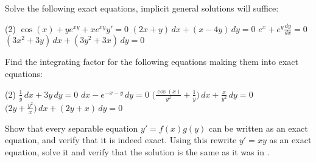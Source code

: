 \begin{exercise}
Solve the following exact equations, implicit general solutions
will suffice:
\begin{tasks}(2)
\task
$\cos(x)+ye^{xy} + xe^{xy} y' = 0$
\task
$(2x+y)\, dx + (x-4y) \, dy = 0$
\task
$e^x + e^y \frac{dy}{dx} = 0$
\task
$(3x^2+3y)\,dx + (3y^2+3x)\, dy = 0$
\end{tasks}
\end{exercise}

\begin{samepage}
\begin{exercise}
Find the integrating factor for the following equations making them into
exact equations:
\begin{tasks}(2)
\task
$\frac{1}{y}\, dx + 3y \, dy = 0$
\task
$dx - e^{-x-y} \, dy = 0$
\task
$\bigl( \frac{\cos(x)}{y^2} + \frac{1}{y} \bigr) \, dx + \frac{x}{y^2} \, dy = 0$
\task
$\bigl( 2y + \frac{y^2}{x} \bigr) \, dx + ( 2y+x )\, dy = 0$
\end{tasks}
\end{exercise}
\end{samepage}

\begin{exercise}
\leavevmode
\begin{tasks}
\task Show that every
separable equation $y' = f(x)g(y)$ can be written as an exact equation,
and verify that it is indeed exact.
\task Using this rewrite $y' = xy$ as an exact equation, solve it and verify
that the solution is the same as it was in .
\end{tasks}
\end{exercise}


